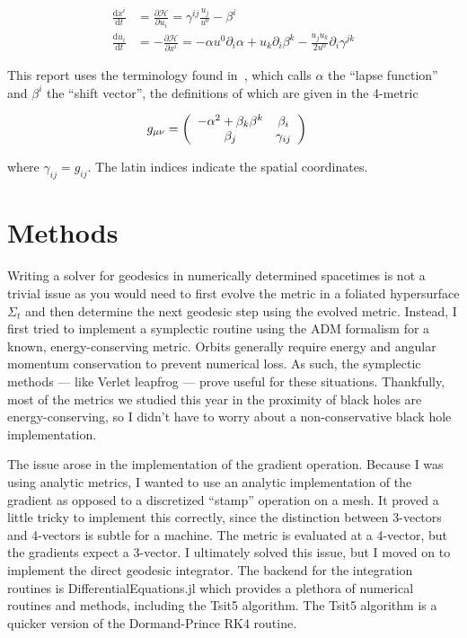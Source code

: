 \documentclass[%
preprint,
onecolumn,
amsmath,amssymb,
aps,
]{revtex4-1}
\newcommand{\D}{\mathrm{d}}
\numberwithin{equation}{section}
\begin{document}
    \begin{align}
        \frac{\D x^{i}}{\D t} &= \frac{\partial \mathcal{H}}{\partial u_{i}} = \gamma^{ij}\frac{u_j}{u^0} - \beta^i \\
        \frac{\D u_{i}}{\D t} &= -\frac{\partial \mathcal{H}}{\partial x^{i}} = -\alpha u^0\partial_i\alpha + u_k\partial_i\beta^k - \frac{u_j u_k}{2u^0}\partial_i\gamma^{jk}
        \label{eq:adm}
    \end{align}

    This report uses the terminology found in~\cite{Bacchini2018}, which calls $\alpha$ the ``lapse function'' and $\beta^i$ the ``shift vector'', the definitions of which are given in the 4-metric

    \begin{align*}
        g_{\mu\nu} &= \left(\begin{array}{c c}
            -\alpha^2 + \beta_k\beta^k & \beta_i \\
            \beta_j & \gamma_{ij}
        \end{array}\right)
    \end{align*}

    where $\gamma_{ij} = g_{ij}$. The latin indices indicate the spatial coordinates.

    \section{\label{sec:methods} Methods}
    Writing a solver for geodesics in numerically determined spacetimes is not a trivial issue as you would need to first evolve the metric in a foliated hypersurface $\Sigma_t$ and then determine the next geodesic step using the evolved metric. Instead, I first tried to implement a symplectic routine using the ADM formalism for a known, energy-conserving metric. Orbits generally require energy and angular momentum conservation to prevent numerical loss. As such, the symplectic methods --- like Verlet leapfrog --- prove useful for these situations. Thankfully, most of the metrics we studied this year in the proximity of black holes are energy-conserving, so I didn't have to worry about a non-conservative black hole implementation. 
    
    The issue arose in the implementation of the gradient operation. Because I was using analytic metrics, I wanted to use an analytic implementation of the gradient as opposed to a discretized ``stamp'' operation on a mesh. It proved a little tricky to implement this correctly, since the distinction between 3-vectors and 4-vectors is subtle for a machine. The metric is evaluated at a 4-vector, but the gradients expect a 3-vector. I ultimately solved this issue, but I moved on to implement the direct geodesic integrator. The backend for the integration routines is DifferentialEquations.jl which provides a plethora of numerical routines and methods, including the Tsit5 algorithm.\cite{Rackauckas2017}\cite{Tsitouras2011} The Tsit5 algorithm is a quicker version of the Dormand-Prince RK4 routine.
\end{document}

